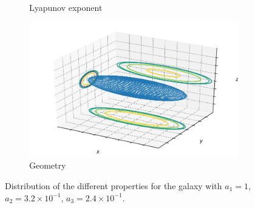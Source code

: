 \begin{figure}[h]
\begin{subfigure}[t]{0.4\textwidth}
        \caption{Lyapunov exponent}
    \end{subfigure}
    \begin{subfigure}[t]{0.4\textwidth}
        \includegraphics[width=\textwidth]{"../Files/Week 13/images/8_ellipsoid"}
        \caption{Geometry}
    \end{subfigure}
    \caption{Distribution of the different properties for the galaxy with $a_1 = 1$, $a_2 = 3.2\times10^{-1}$, $a_3 = 2.4\times10^{-1}$.}
    \label{fig: g21}
\end{figure}


